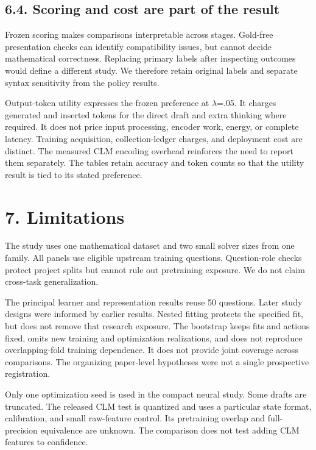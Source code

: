 \documentclass[11pt,a4paper]{article}
\begin{document}
\subsection*{6.4. Scoring and cost are part of the result}\label{sec:64-scoring-and-cost-are-part-of-the-result}
Frozen scoring makes comparisons interpretable across stages. Gold-free presentation checks can identify compatibility issues, but cannot decide mathematical correctness. Replacing primary labels after inspecting outcomes would define a different study. We therefore retain original labels and separate syntax sensitivity from the policy results.

Output-token utility expresses the frozen preference at \ensuremath{\lambda}=.05. It charges generated and inserted tokens for the direct draft and extra thinking where required. It does not price input processing, encoder work, energy, or complete latency. Training acquisition, collection-ledger charges, and deployment cost are distinct. The measured CLM encoding overhead reinforces the need to report them separately. The tables retain accuracy and token counts so that the utility result is tied to its stated preference.

\section*{7. Limitations}\label{sec:7-limitations}
The study uses one mathematical dataset and two small solver sizes from one family. All panels use eligible upstream training questions. Question-role checks protect project splits but cannot rule out pretraining exposure. We do not claim cross-task generalization.

The principal learner and representation results reuse 50 questions. Later study designs were informed by earlier results. Nested fitting protects the specified fit, but does not remove that research exposure. The bootstrap keeps fits and actions fixed, omits new training and optimization realizations, and does not reproduce overlapping-fold training dependence. It does not provide joint coverage across comparisons. The organizing paper-level hypotheses were not a single prospective registration.

Only one optimization seed is used in the compact neural study. Some drafts are truncated. The released CLM test is quantized and uses a particular state format, calibration, and small raw-feature control. Its pretraining overlap and full-precision equivalence are unknown. The comparison does not test adding CLM features to confidence.
\end{document}
